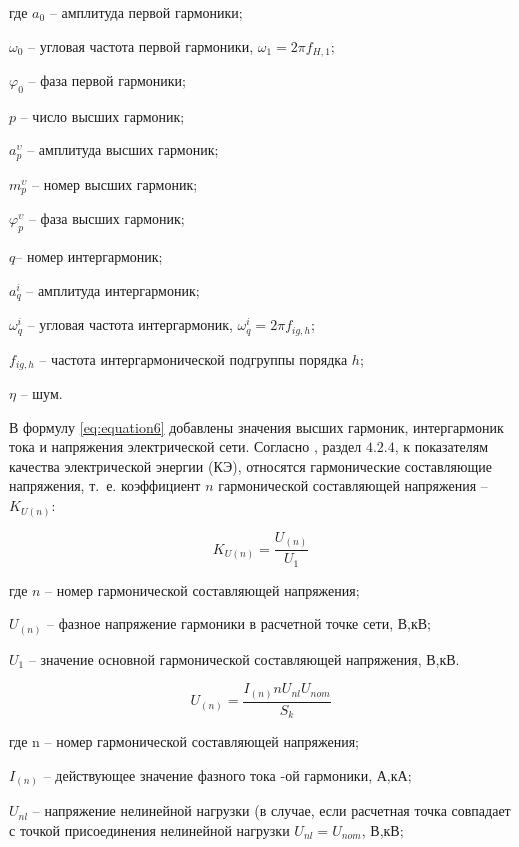 где $a_{0}$ – амплитуда первой гармоники;

$\omega_{0}$ – угловая частота первой гармоники, $\omega_{1} = 2 \pi f_{H,1}$;

$\varphi_{0}$ – фаза первой гармоники; 

$p$ – число высших гармоник;

$a_p^{\upsilon}$ – амплитуда высших гармоник;

$m_p^{\upsilon}$ – номер высших гармоник;

$\varphi_p^{\upsilon}$ – фаза высших гармоник;

$q$– номер интергармоник;

$a_q^i$ – амплитуда интергармоник;

$\omega_q^i$ – угловая частота интергармоник, $\omega_q^i=2\pi f_{ig,h}$; 

$f_{ig,h}$ – частота интергармонической подгруппы порядка $h$;

$\eta$ – шум.

В формулу \ref{eq:equation6} добавлены значения высших гармоник, интергармоник тока и напряжения электрической сети.
Согласно \cite{GOST32144-2013}, раздел $4.2.4$, к показателям качества электрической энергии (КЭ), относятся гармонические составляющие напряжения, т.~е. коэффициент  $n$ гармонической составляющей напряжения – $K_{U(n)}$:

\begin{equation}
	\label{eq:equation7}
K_{U(n)} = \frac{U_{(n)}}{U_1}
\end{equation}

где $n$ – номер гармонической составляющей напряжения;
 
$U_{(n)}$ – фазное напряжение гармоники в расчетной точке сети, В,кВ;

$U_1$ – значение основной гармонической составляющей напряжения, В,кВ.

\begin{equation}
	\label{eq:equation8}
	U_(n) = \frac{I_{(n)} n U_{nl} U_{nom}}{S_k}
\end{equation}

где n – номер гармонической составляющей напряжения;

$I_{(n)}$ – действующее значение фазного тока -ой гармоники, А,кА;

$U_{nl}$ – напряжение нелинейной нагрузки (в случае, если расчетная точка совпадает с точкой присоединения нелинейной нагрузки $U_{nl} = U_{nom}$, В,кВ;

